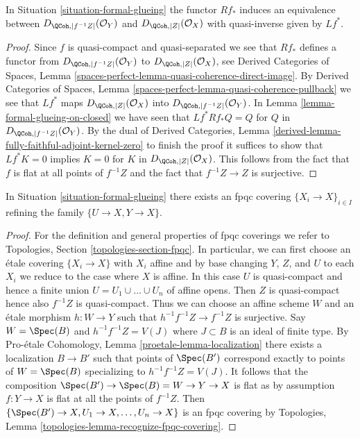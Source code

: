 \begin{lemma}
\label{lemma-derived-equivalent}
In Situation \ref{situation-formal-glueing} the functor
$Rf_*$ induces an equivalence between $D_{\QCoh, |f^{-1}Z|}(\mathcal{O}_Y)$
and $D_{\QCoh, |Z|}(\mathcal{O}_X)$ with quasi-inverse given by
$Lf^*$.
\end{lemma}

\begin{proof}
Since $f$ is quasi-compact and quasi-separated we see that $Rf_*$
defines a functor from $D_{\QCoh, |f^{-1}Z|}(\mathcal{O}_Y)$
to $D_{\QCoh, |Z|}(\mathcal{O}_X)$, see
Derived Categories of Spaces, Lemma
\ref{spaces-perfect-lemma-quasi-coherence-direct-image}.
By Derived Categories of Spaces, Lemma
\ref{spaces-perfect-lemma-quasi-coherence-pullback}
we see that $Lf^*$ maps $D_{\QCoh, |Z|}(\mathcal{O}_X)$
into $D_{\QCoh, |f^{-1}Z|}(\mathcal{O}_Y)$.
In Lemma \ref{lemma-formal-glueing-on-closed} we have seen that
$Lf^*Rf_*Q = Q$ for $Q$ in $D_{\QCoh, |f^{-1}Z|}(\mathcal{O}_Y)$.
By the dual of Derived Categories, Lemma
\ref{derived-lemma-fully-faithful-adjoint-kernel-zero}
to finish the proof it suffices to show that $Lf^*K = 0$
implies $K = 0$ for $K$ in $D_{\QCoh, |Z|}(\mathcal{O}_X)$.
This follows from the fact that $f$ is flat at all points of
$f^{-1}Z$ and the fact that $f^{-1}Z \to Z$ is surjective.
\end{proof}

\begin{lemma}
\label{lemma-dominate-by-fpqc-covering}
In Situation \ref{situation-formal-glueing} there exists an
fpqc covering $\{X_i \to X\}_{i \in I}$ refining the
family $\{U \to X, Y \to X\}$.
\end{lemma}

\begin{proof}
For the definition and general properties of fpqc coverings we refer to
Topologies, Section \ref{topologies-section-fpqc}. In particular, we can
first choose an \'etale covering $\{X_i \to X\}$ with $X_i$ affine and by
base changing $Y$, $Z$, and $U$ to each $X_i$ we reduce to the case where
$X$ is affine. In this case $U$ is quasi-compact and hence a finite union
$U = U_1 \cup \ldots \cup U_n$ of affine opens. 
Then $Z$ is quasi-compact hence also $f^{-1}Z$ is quasi-compact.
Thus we can choose an affine scheme $W$ and an \'etale morphism
$h : W \to Y$ such that $h^{-1}f^{-1}Z \to f^{-1}Z$ is surjective.
Say $W = \Spec(B)$ and $h^{-1}f^{-1}Z = V(J)$ where $J \subset B$
is an ideal of finite type.
By Pro-\'etale Cohomology, Lemma \ref{proetale-lemma-localization}
there exists a localization $B \to B'$ such that points of
$\Spec(B')$ correspond exactly to points of $W = \Spec(B)$
specializing to $h^{-1}f^{-1}Z = V(J)$. It follows that the
composition $\Spec(B') \to \Spec(B) = W \to Y \to X$ is flat
as by assumption $f : Y \to X$ is flat at all the points of $f^{-1}Z$. Then
$\{\Spec(B') \to X, U_1 \to X, \ldots, U_n \to X\}$
is an fpqc covering by
Topologies, Lemma \ref{topologies-lemma-recognize-fpqc-covering}.
\end{proof}




